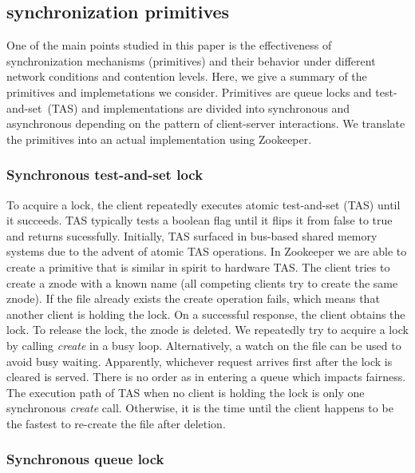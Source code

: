 \subsection{synchronization primitives}

One of the main points studied in this paper is the effectiveness of synchronization mechanisms (primitives) and their behavior under different network conditions and contention levels. Here, we give a summary of the primitives and implemetations we consider. Primitives are queue locks and test-and-set~(TAS) and implementations are divided into synchronous and asynchronous depending on the pattern of client-server interactions. We translate the primitives into an actual implementation using Zookeeper.

\subsubsection{Synchronous test-and-set lock}

To acquire a lock, the client repeatedly executes atomic test-and-set (TAS) until it succeeds. TAS typically tests a boolean flag until it flips it from false to true and returns sucessfully. Initially, TAS surfaced in bus-based shared memory systems due to the advent of atomic TAS operations. In Zookeeper we are able to create a primitive that is similar in spirit to hardware TAS. The client tries to create a znode with a known name (all competing clients try to create the same znode). If the file already exists the create operation fails, which means that another client is holding the lock. On a successful response, the client obtains the lock. To release the lock, the znode is deleted. We repeatedly try to acquire a lock by calling \emph{create} in a busy loop. Alternatively, a watch on the file can be used to avoid busy waiting. Apparently, whichever request arrives first after the lock is cleared is served. There is no order as in entering a queue which impacts fairness. The execution path of TAS when no client is holding the lock is only one synchronous \emph{create} call. Otherwise, it is the time until the client happens to be the fastest to re-create the file after deletion.

\subsubsection{Synchronous queue lock}

